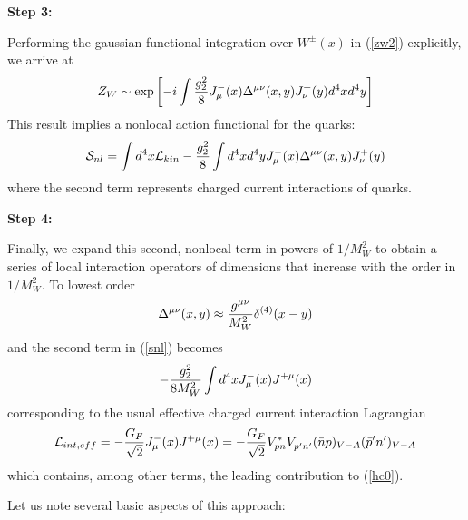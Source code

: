 \documentclass[12pt,rotate]{article}
\newcommand{\eqn}{\ref}
\begin{document}
\begin{itemize}
\begin{itemize}
{\bf Step 3:}

Performing the gaussian functional integration over $W^\pm(x)$ in
(\eqn{zw2}) explicitly, we arrive at
\begin{equation}\label{zetw}
Z_W\sim\exp\left[ -i\int{g^2_2\over 8}J^-_\mu(x)\Delta^{\mu\nu}(x, y)
J^+_\nu(y) d^4x d^4y \right]   \end{equation}
This  result implies a nonlocal action functional for the quarks:
\begin{equation}\label{snl}
{\cal S}_{nl}=\int d^4x {\cal L}_{kin}-
{g^2_2\over 8}\int d^4x d^4y J^-_\mu(x)\Delta^{\mu\nu}(x, y)
J^+_\nu(y)    \end{equation}
where the second term represents
 charged current interactions of quarks.

{\bf Step 4:}

Finally, we expand this second, nonlocal term in powers of
$1/M^2_W$ to obtain a series of local interaction operators of
dimensions that increase with the order in $1/M^2_W$. To lowest order
\begin{equation}\label{dloc}
\Delta^{\mu\nu}(x, y)\approx{g^{\mu\nu}\over M^2_W}\delta^{(4)}(x-y) 
\end{equation}
and the second term in (\eqn{snl}) becomes
\begin{equation}\label{jjx}
-{g^2_2\over 8M^2_W}\int d^4x J^-_\mu(x) J^{+\mu}(x)  \end{equation}
corresponding to the usual effective charged current interaction
Lagrangian
\begin{equation}\label{leff}
{\cal L}_{int,eff}=-{G_F\over\sqrt{2}} J^-_\mu(x) J^{+\mu}(x)=-
{G_F\over\sqrt{2}}V^*_{pn}V_{p'n'}^{}(\bar np)_{V-A}
  (\bar p'n')_{V-A}
\end{equation}
which contains, among other terms, the leading contribution to 
(\ref{hc0}).

Let us note several  basic aspects of this approach:


\end{itemize}
\end{itemize}
\end{document}

